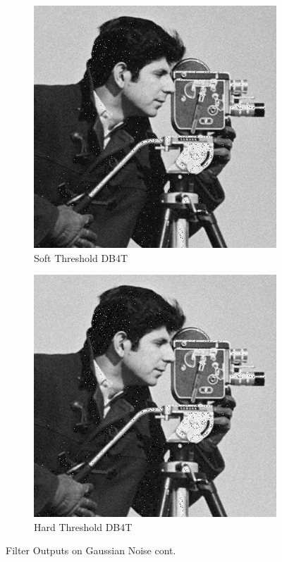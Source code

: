 \documentclass{article}\raggedbottom
\begin{document}
\begin{figure}[H]
	\centering
	\begin{subfigure}[b]{0.45\linewidth}
		\includegraphics[width=\linewidth]{../../2_Software/data/IDB4T_soft_g.png}
		\caption{Soft Threshold DB4T}
	\end{subfigure}
	\begin{subfigure}[b]{0.45\linewidth}
		\includegraphics[width=\linewidth]{../../2_Software/data/IDB4T_hard_g.png}
		\caption{Hard Threshold DB4T}
	\end{subfigure}
	\caption{Filter Outputs on Gaussian Noise cont.}
	\label{fig:filter_outputs_2}
\end{figure}
\end{document}
